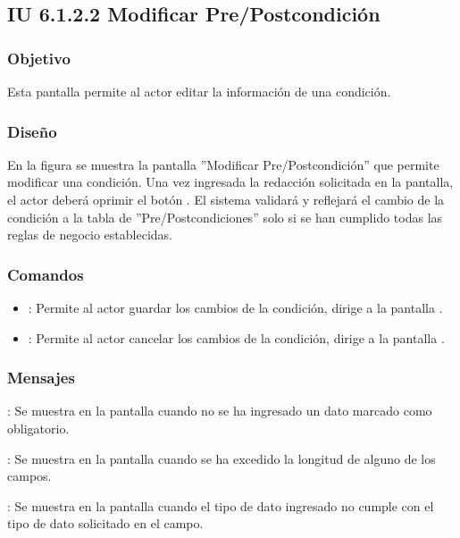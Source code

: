 \subsection{IU 6.1.2.2 Modificar Pre/Postcondición}

\subsubsection{Objetivo}
	Esta pantalla permite al actor editar la información de una condición.
\subsubsection{Diseño}
	En la figura  se muestra la pantalla ''Modificar Pre/Postcondición'' que permite modificar una condición. Una vez ingresada la redacción solicitada en la pantalla, el actor deberá oprimir el botón  . El sistema validará y reflejará el cambio de la condición a la tabla de ''Pre/Postcondiciones'' solo si se han cumplido todas las reglas de negocio establecidas.

\subsubsection{Comandos}
\begin{itemize}
	\item {}: Permite al actor guardar los cambios de la condición, dirige a la pantalla .
	\item {}: Permite al actor cancelar los cambios de la condición, dirige a la pantalla .
\end{itemize}

\subsubsection{Mensajes}

\begin{Citemize}
	\item {}: Se muestra en la pantalla  cuando no se ha ingresado un dato marcado como obligatorio.
	\item {}: Se muestra en la pantalla  cuando se ha excedido la longitud de alguno de los campos.
	\item {}: Se muestra en la pantalla  cuando el tipo de dato ingresado no cumple con el tipo de dato solicitado en el campo.
\end{Citemize}
